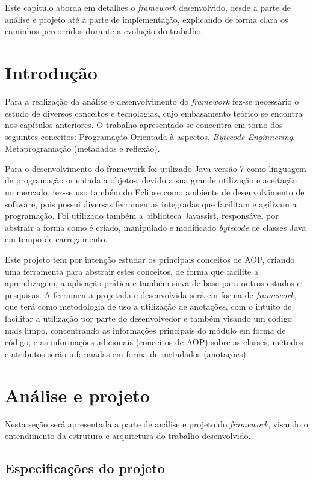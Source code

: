 \documentclass[tc,openright]{iiufrgs}
\begin{document}
Este capítulo aborda em detalhes o \textit{framework} desenvolvido, desde a parte de análise  e projeto até a parte de implementação, explicando de forma clara os caminhos percorridos durante a evolução do trabalho.

\section{Introdução}

Para a realização da análise e desenvolvimento do \textit{framework} fez-se necessário o estudo de diversos conceitos e tecnologias,  cujo embasamento teórico se encontra nos capítulos anteriores. O trabalho apresentado se concentra em torno dos seguintes conceitos: Programação Orientada à aspectos, \textit{Bytecode Enginnering}, Metaprogramação (metadados e reflexão).

Para o desenvolvimento do framework foi utilizado Java versão 7 como linguagem de programação orientada a objetos, devido a sua grande utilização e aceitação no mercado, fez-se uso também do Eclipse como ambiente de desenvolvimento de software, pois possui diversas ferramentas integradas que facilitam e agilizam a programação. Foi utilizado também a biblioteca Javassist, responsável por abstraír a forma como é criado, manipulado e modificado \textit{bytecode} de classes Java em tempo de carregamento. 

Este projeto tem por intenção estudar os principais conceitos de AOP,  criando uma ferramenta para abstrair estes conceitos, de forma que facilite a aprendizagem, a aplicação prática e também sirva de base para outros estudos e pesquisas. A ferramenta projetada e desenvolvida será em forma de \textit{framework}, que terá como metodologia de uso a utilização de anotações, com o intuito de facilitar a utilização por parte do desenvolvedor e também visando um código mais limpo, concentrando as informações principais do módulo em forma de código, e as informações adicionais (conceitos de AOP) sobre as classes, métodos e atributos serão informadas em forma de metadados (anotações).
\section{Análise e projeto}

Nesta seção será apresentada a parte de análise e projeto do \textit{framework}, visando o entendimento da estrutura e arquitetura do trabalho desenvolvido.

\subsection{Especificações do projeto}
\end{document}
